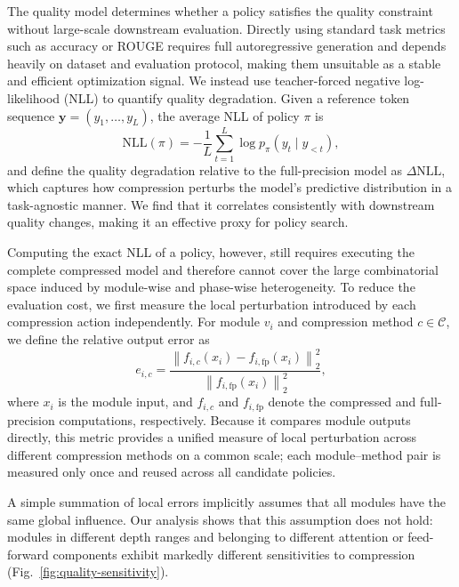 \documentclass[letterpaper]{article} %
\begin{document}
The quality model determines whether a policy satisfies the quality constraint without large-scale downstream evaluation. Directly using standard task metrics such as accuracy or ROUGE requires full autoregressive generation and depends heavily on dataset and evaluation protocol, making them unsuitable as a stable and efficient optimization signal. We instead use teacher-forced negative log-likelihood (NLL) to quantify quality degradation. Given a reference token sequence $\mathbf{y}=(y_1,\ldots,y_L)$, the average NLL of policy $\pi$ is
\begin{equation}
\mathrm{NLL}(\pi)
=
-\frac{1}{L}
\sum_{t=1}^{L}
\log p_{\pi}(y_t\mid y_{<t}),
\end{equation}
and define the quality degradation relative to the full-precision model as $\Delta\mathrm{NLL}$, which captures how compression perturbs the model's predictive distribution in a task-agnostic manner. We find that it correlates consistently with downstream quality changes, making it an effective proxy for policy search.

Computing the exact NLL of a policy, however, still requires executing the complete compressed model and therefore cannot cover the large combinatorial space induced by module-wise and phase-wise heterogeneity. To reduce the evaluation cost, we first measure the local perturbation introduced by each compression action independently. For module $v_i$ and compression method $c\in\mathcal{C}$, we define the relative output error as
\begin{equation}
e_{i,c}
=
\frac{
\left\|
f_{i,c}(x_i)-f_{i,\mathrm{fp}}(x_i)
\right\|_2^2
}{
\left\|
f_{i,\mathrm{fp}}(x_i)
\right\|_2^2
},
\end{equation}
where $x_i$ is the module input, and $f_{i,c}$ and $f_{i,\mathrm{fp}}$ denote the compressed and full-precision computations, respectively. Because it compares module outputs directly, this metric provides a unified measure of local perturbation across different compression methods on a common scale; each module--method pair is measured only once and reused across all candidate policies.

A simple summation of local errors implicitly assumes that all modules have the same global influence. Our analysis shows that this assumption does not hold: modules in different depth ranges and belonging to different attention or feed-forward components exhibit markedly different sensitivities to compression (Fig.~\ref{fig:quality-sensitivity}).
\end{document}
